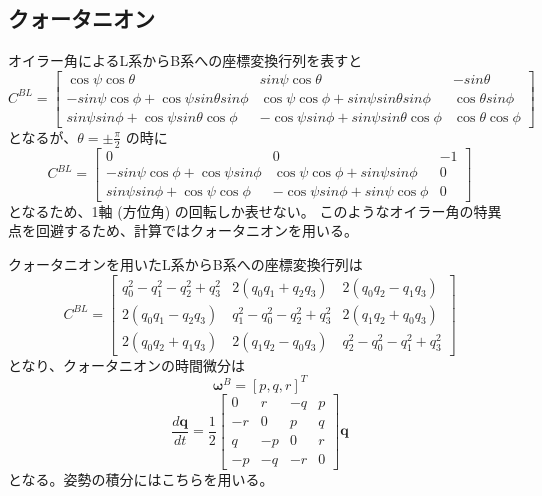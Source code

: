 ﻿\documentclass[a4paper]{jsarticle}
\begin{document}
\subsection{クォータニオン}
オイラー角によるL系からB系への座標変換行列を表すと
\begin{equation}
C^{BL} = 
\begin{bmatrix}
 \cos\psi \cos\theta & sin\psi \cos\theta & -sin\theta \\
 -sin\psi \cos\phi + \cos\psi sin\theta sin\phi & \cos\psi \cos\phi + sin\psi sin\theta sin\phi & \cos\theta sin\phi \\
 sin\psi sin\phi + \cos\psi sin\theta \cos\phi & -\cos\psi sin\phi + sin\psi sin\theta \cos\phi & \cos\theta \cos\phi
\end{bmatrix}
\end{equation}
となるが、$\theta=\pm{\frac{\pi}{2}}$ の時に
\begin{equation}
C^{BL} = 
\begin{bmatrix}
 0 & 0 & -1 \\
 -sin\psi \cos\phi + \cos\psi sin\phi & \cos\psi \cos\phi + sin\psi sin\phi & 0 \\
 sin\psi sin\phi + \cos\psi \cos\phi & -\cos\psi sin\phi + sin\psi \cos\phi & 0
\end{bmatrix}
\end{equation}
となるため、1軸 (方位角) の回転しか表せない。
このようなオイラー角の特異点を回避するため、計算ではクォータニオンを用いる。

クォータニオンを用いたL系からB系への座標変換行列は
\begin{equation}
C^{BL} = 
\begin{bmatrix}
 q_0^2 - q_1^2 - q_2^2 + q_3^2 & 2 (q_0  q_1 + q_2  q_3) & 2 (q_0  q_2 - q_1  q_3) \\
 2 (q_0  q_1 - q_2  q_3) & q_1^2 - q_0^2 - q_2^2 + q_3^2 & 2 (q_1  q_2 + q_0  q_3) \\
 2 (q_0  q_2 + q_1  q_3) & 2 (q_1  q_2 - q_0  q_3) & q_2^2 - q_0^2 - q_1^2 + q_3^2
\end{bmatrix}
\end{equation}
となり、クォータニオンの時間微分は
\begin{equation}
\bm{\omega}^B = [p, q, r]^T
\end{equation}
\begin{equation}
\frac{d\bm{q}}{dt} = \frac{1}{2}
\begin{bmatrix}
 0 & r & -q & p \\
 -r & 0 & p & q \\
 q & -p & 0 & r \\
 -p & -q & -r & 0
\end{bmatrix}
\bm{q}
\end{equation}
となる。姿勢の積分にはこちらを用いる。
\end{document}
